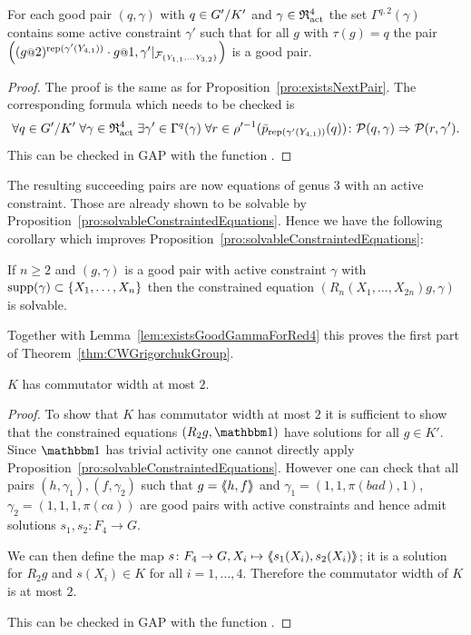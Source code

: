 \documentclass[a4paper,11pt]{amsart}
\begin{document}
\begin{pro}\label{pro:existsNextPair4}
 For each good pair $(q,\gamma)$ with $q\in{G'/K'}$ and $\gamma\in\mathfrak{R}^4_{\operatorname{act}}$ the set 
  $\Gamma^{q,2}(\gamma)$
 contains some active constraint $\gamma'$ such that for all $g$ with $\tau
 (g)=q$ the
 pair $\left((g\at{2})^{\rep(\gamma'(Y_{4,1}))}\cdot g\at{1},\gamma'|
 _{\mathcal F_{\{Y_{1,1},\ldots Y_{3,2}\}}}\right)$ is a good pair.
\end{pro}
\begin{proof}
The proof is the same as for Proposition~\ref{pro:existsNextPair}. The corresponding formula which needs to be checked is 
\[\forall q\in{G'/K'}\;
      \forall \gamma\in\mathfrak{R}^4_{\operatorname{act}}\;
	 \exists \gamma'\in \Gamma^q(\gamma)\;
	    \forall r\in \rho'^{-1}(\bar p_{\operatorname{rep}(\gamma'(Y_{4,1}))}(q))\colon
	      \mathcal{P}(q,\gamma) \Rightarrow \mathcal{P}(r,\gamma').\]
 This can be checked in GAP with the function . 
\end{proof}
The resulting succeeding pairs are now equations of genus $3$ with an active constraint. 
Those are already shown to be solvable 
by Proposition~\ref{pro:solvableConstraintedEquations}. Hence we have the following
corollary which improves Proposition~\ref{pro:solvableConstraintedEquations}:
\begin{cor}\label{cor:solvableConstraintedEquations}
If $n\geq2$ and $(g,\gamma)$ is a good pair with active constraint $\gamma$ with $\operatorname{{supp}}(\gamma)\subset\{X_1,\dotsc,X_{n}\}$
 then the constrained equation $(R_n(X_1,\dotsc,X_{2n})g,\gamma)$ is solvable. 
\end{cor}
Together with Lemma~\ref{lem:existsGoodGammaForRed4} this proves the first part of Theorem~\ref{thm:CWGrigorchukGroup}.
\begin{cor}\label{cor:KhasCW2}
 $K$ has commutator width at most $2$. 
\end{cor}
\begin{proof}
 To show that $K$ has commutator width at most $2$ it is sufficient to show that 
 the constrained equations $(R_2g,\id)$ have solutions for all $g\in K'$. 
 Since $\id$ has trivial activity one cannot directly apply 
 Proposition~\ref{pro:solvableConstraintedEquations}.  However one can check that all 
 pairs $(h,\gamma_1),(f,\gamma_2)$ such that $g=\langle\negthickspace\langle h,f\rangle\negthickspace\rangle$ and
 $\gamma_1=(1,1,\pi(bad),1)$, $\gamma_2=(1,1,1,\pi(ca))$ are good pairs with active
 constraints and hence admit solutions $s_1,s_2\colon F_4\to G$.
 
 We can then define the map $s\colon F_4\to G, X_i\mapsto \langle\negthickspace\langle s_1(X_i),s_2(X_i)\rangle\negthickspace\rangle$; it is a solution
 for $R_2g$ and $s(X_i)\in K$ for all $i=1,\dotsc,4$. Therefore the commutator width of $K$ is at most $2$.
 
 This can be checked in GAP with the function . 
\end{proof}
\end{document}
